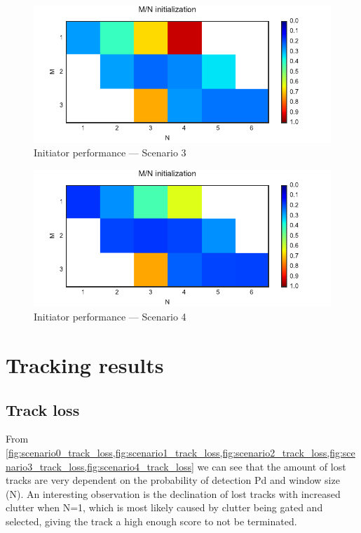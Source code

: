 \begin{figure}
 \centering
 \includegraphics{Figures/plots/Scenario3_Init-Performance.pdf}
 \caption{Initiator performance --- Scenario 3}\label{fig:init_performance_scenario3}
\end{figure}
\begin{figure}
 \centering
 \includegraphics{Figures/plots/Scenario4_Init-Performance.pdf}
 \caption{Initiator performance --- Scenario 4}\label{fig:init_performance_scenario4}
\end{figure}

\section{Tracking results}
\subsection{Track loss}
From \cref{fig:scenario0_track_loss,fig:scenario1_track_loss,fig:scenario2_track_loss,fig:scenario3_track_loss,fig:scenario4_track_loss} we can see that the amount of lost tracks are very dependent on the probability of detection \gls{Pd} and window size (N). An interesting observation is the declination of lost tracks with increased clutter when N=1, which is most likely caused by clutter being gated and selected, giving the track a high enough score to not be terminated. 

